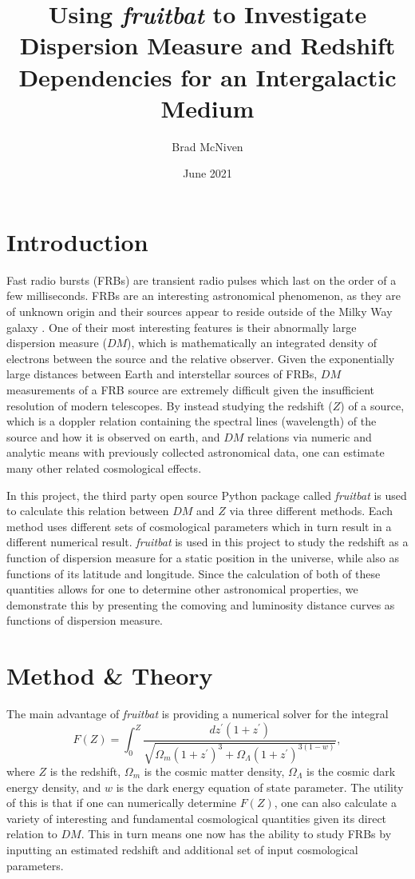 \documentclass{article}
\title{Using {\it fruitbat} to Investigate Dispersion Measure and Redshift Dependencies for an Intergalactic Medium}
\author{Brad McNiven}
\date{June 2021}
\begin{document}
\maketitle



\section{Introduction}

Fast radio bursts (FRBs) are transient radio pulses which last on the order of a few milliseconds. FRBs are an interesting astronomical phenomenon, as they are of unknown origin and their sources appear to reside outside of the Milky Way galaxy \cite{Petroff}. One of their most interesting features is their abnormally large dispersion measure ($DM$), which is mathematically an integrated density of electrons between the source and the relative observer. Given the exponentially large distances between Earth and interstellar sources of FRBs, $DM$ measurements of a FRB source are extremely difficult given the insufficient resolution of modern telescopes. By instead studying the redshift ($Z$) of a source, which is a doppler relation containing the spectral lines (wavelength) of the source and how it is observed on earth, and $DM$ relations via numeric and analytic means with previously collected astronomical data, one can estimate many other related cosmological effects.

In this project, the third party open source Python package called {\it fruitbat} \cite{fruitbat} is used to calculate this relation between $DM$ and $Z$ via three different methods. Each method uses different sets of cosmological parameters which in turn result in a different numerical result. {\it fruitbat} is used in this project to study the redshift as a function of dispersion measure for a static position in the universe, while also as functions of its latitude and longitude. Since the calculation of both of these quantities allows for one to determine other astronomical properties, we demonstrate this by presenting the comoving and luminosity distance curves as functions of dispersion measure.

\section{Method \& Theory}

The main advantage of {\it fruitbat} is providing a numerical solver for the integral
\begin{equation}
F(Z) = \int_0^Z \frac{dz^{\prime}(1 + z ^\prime )}{\sqrt{\Omega_m(1+z^\prime)^3 + \Omega_{\Lambda} (1+z^\prime)^{3(1-w)}}},
\label{eq:integral}
\end{equation}
where $Z$ is the redshift, $\Omega_m$ is the cosmic matter density, $\Omega_\Lambda$ is the cosmic dark energy density, and $w$ is the dark energy equation of state parameter. The utility of this is that if one can numerically determine $F(Z)$, one can also calculate a variety of interesting and fundamental cosmological quantities given its direct relation to $DM$. This in turn means one now has the ability to study FRBs by inputting an estimated redshift and additional set of input cosmological parameters. 
\end{document}
